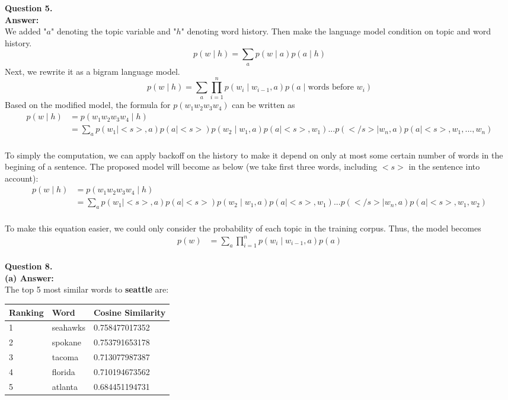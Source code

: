 \documentclass{article}
\begin{document}
\noindent
\textbf{Question 5.}\\
\textbf{Answer:}\\
We added "$a$" denoting the topic variable and "$h$" denoting word history. Then make the language model condition on topic and word history.
$$p(w \mid h) = \sum_a p(w \mid a)p(a \mid h)$$
Next, we rewrite it as a bigram language model.\\
$$p(w \mid h) = \sum_a \prod_{i=1}^n p(w_i \mid w_{i-1}, a)p(a \mid \text{words before } w_i)$$
Based on the modified model, the formula for $p(w_1w_2w_3w_4)$ can be written as
\begin{align*}
    p(w \mid h) 
    &= p(w_1w_2w_3w_4 \mid h)
    \\&= \sum_a p(w_1 \mid <s>, a)p(a \mid <s>)p(w_2 \mid w_1, a)p(a \mid <s>, w_1)...p(</s> \mid w_n, a)p(a \mid <s>, w_1, ..., w_n)
\end{align*}\\
To simply the computation, we can apply backoff on the history to make it depend on only at most some certain number of words in the begining of a sentence. The proposed model will become as below (we take first three words, including $<s>$ in the sentence into account):\\
\begin{align*}
    p(w \mid h) 
    &= p(w_1w_2w_3w_4 \mid h)
    \\&= \sum_a p(w_1 \mid <s>, a)p(a \mid <s> )p(w_2 \mid w_1, a)p(a \mid <s>, w_1)...p(</s> \mid w_n, a)p(a \mid <s>, w_1, w_2)
\end{align*}\\
To make this equation easier, we could only consider the probability of each topic in the training corpus. Thus, the model becomes\\
\begin{align*}
    p(w) 
    &= \sum_a \prod_{i=1}^n p(w_i \mid w_{i-1}, a)p(a)
\end{align*}\\


\textbf{Question 8.}\\
\textbf{(a) Answer:}\\
The top 5 most similar words to \textbf{seattle} are:\\
\begin{tabular}{ p{2.5cm}|p{2.5cm}|p{3cm}  }
 \hline
 Ranking & Word & Cosine Similarity\\
 \hline
 1 & seahawks & 0.758477017352 \\
 2 & spokane  & 0.753791653178 \\
 3 & tacoma   & 0.713077987387 \\
 4 & florida  & 0.710194673562 \\
 5 & atlanta  & 0.684451194731 \\
 \hline
\end{tabular}\\
\end{document}
